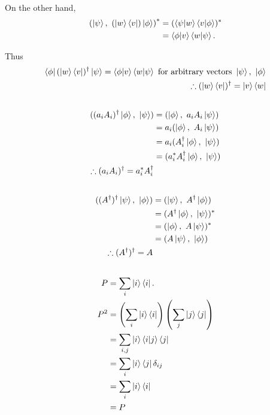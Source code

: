 On the other hand,
\begin{align}
	\left(\ket{\psi},\ (\ket{w}\bra{v}) \ket{\phi}\right)^* 
	&= (\braket{\psi | w} \braket{v | \phi})^*\\
	&= \braket{\phi | v} \braket{w | \psi}.
\end{align}

Thus
\begin{align}
	\bra{\phi} (\ket{w}\bra{v})^\dagger \ket{\psi} = \braket{\phi | v} \braket{w | \psi} \text{ for arbitrary vectors } \ket{\psi},\ \ket{\phi}\\
	\therefore (\ket{w}\bra{v})^\dagger = \ket{v}\bra{w}
\end{align}


\subsection{}
\begin{align}
	( (a_i A_i)^\dagger \ket{\phi},\ \ket{\psi} )
	&= (\ket{\phi},\ a_i A_i \ket{\psi})\\
	&= a_i (\ket{\phi},\ A_i \ket{\psi})\\
	&= a_i (A_i^\dagger \ket{\phi},\ \ket{\psi})\\
	&= (a_i^* A_i^\dagger \ket{\phi},\ \ket{\psi})\\
%	
	\therefore (a_i A_i)^\dagger = a_i^* A_i^\dagger
\end{align}




\subsection{}
\begin{align}
	((A^\dagger)^\dagger\ket{\psi},\ \ket{\phi} )
	&= (\ket{\psi},\ A^\dagger \ket{\phi})\\
	&= (A^\dagger \ket{\phi},\ \ket{\psi})^*\\
	&= (\ket{\phi},\ A\ket{\psi})^*\\
	&= (A\ket{\psi},\ \ket{\phi})\\
	\therefore (A^\dagger)^\dagger = A
\end{align}


\subsection{}
\begin{align}
	P &= \sum_i \ket{i}\bra{i}.\\
	P^2 &= \left(\sum_i \ket{i}\bra{i}\right) \left(\sum_j \ket{j}\bra{j}\right)\\
	&= \sum_{i,j} \ket{i}\braket{i | j}\bra{j}\\
	&= \sum_i \ket{i}\bra{j} \delta_{ij}\\
	&= \sum_i \ket{i}\bra{i}\\
	&= P
\end{align}




